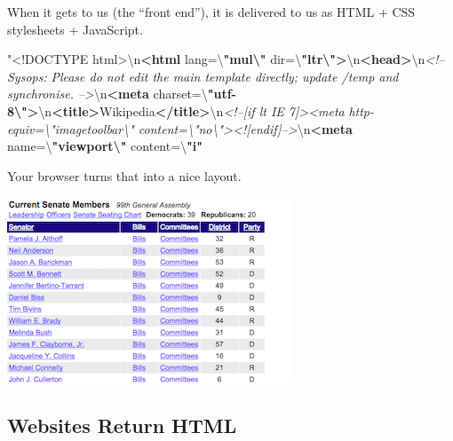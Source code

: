 \documentclass[]{book}
\newenvironment{Shaded}{\begin{snugshade}}{\end{snugshade}}
\newcommand{\KeywordTok}[1]{\textcolor[rgb]{0.13,0.29,0.53}{\textbf{#1}}}
\newcommand{\DataTypeTok}[1]{\textcolor[rgb]{0.13,0.29,0.53}{#1}}
\newcommand{\StringTok}[1]{\textcolor[rgb]{0.31,0.60,0.02}{#1}}
\newcommand{\CommentTok}[1]{\textcolor[rgb]{0.56,0.35,0.01}{\textit{#1}}}
\newcommand{\OtherTok}[1]{\textcolor[rgb]{0.56,0.35,0.01}{#1}}
\newcommand{\ErrorTok}[1]{\textcolor[rgb]{0.64,0.00,0.00}{\textbf{#1}}}
\newcommand{\NormalTok}[1]{#1}
\begin{document}
When it gets to us (the ``front end''), it is delivered to us as HTML +
CSS stylesheets + JavaScript.

\begin{Shaded}
\begin{Highlighting}[]
\NormalTok{"}\DataTypeTok{<!DOCTYPE }\NormalTok{html}\DataTypeTok{>}\NormalTok{\textbackslash{}n}\KeywordTok{<html}\OtherTok{ lang=}\StringTok{\textbackslash{}}\ErrorTok{"mul\textbackslash{}"}\OtherTok{ dir=}\StringTok{\textbackslash{}}\ErrorTok{"ltr\textbackslash{}"}\KeywordTok{>}\NormalTok{\textbackslash{}n}\KeywordTok{<head>}\NormalTok{\textbackslash{}n}\CommentTok{<!-- Sysops: }
\CommentTok{Please do not edit the main template directly; update /temp and synchronise. }
\CommentTok{-->}\NormalTok{\textbackslash{}n}\KeywordTok{<meta}\OtherTok{ charset=}\StringTok{\textbackslash{}}\ErrorTok{"utf-8\textbackslash{}"}\KeywordTok{>}\NormalTok{\textbackslash{}n}\KeywordTok{<title>}\NormalTok{Wikipedia}\KeywordTok{</title>}\NormalTok{\textbackslash{}n}\CommentTok{<!--[if lt IE 7]><meta}
\CommentTok{http-equiv=\textbackslash{}"imagetoolbar\textbackslash{}" content=\textbackslash{}"no\textbackslash{}"><![endif]-->}\NormalTok{\textbackslash{}n}\KeywordTok{<meta}\OtherTok{ name=}\StringTok{\textbackslash{}}\ErrorTok{"viewport\textbackslash{}"}
\OtherTok{content=}\StringTok{\textbackslash{}}\ErrorTok{"i"}
\end{Highlighting}
\end{Shaded}

Your browser turns that into a nice layout.

\begin{center}\includegraphics[width=0.7\linewidth]{img/layout} \end{center}

\subsection{Websites Return HTML}\label{websites-return-html}
\end{document}
